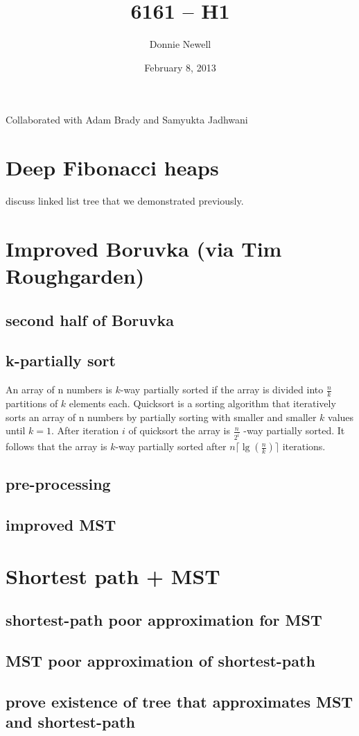 \setlength{\topmargin}{-.5in}
\setlength{\textheight}{9in}
\setlength{\oddsidemargin}{.125in}
\setlength{\textwidth}{6.25in}

\title{6161 -- H1}
\author{Donnie Newell}
\date{February 8, 2013}
\maketitle

Collaborated with Adam Brady and Samyukta Jadhwani
\section{Deep Fibonacci heaps}
discuss linked list tree that we demonstrated previously.
\section{Improved Boruvka (via Tim Roughgarden)}
\subsection{second half of Boruvka}

\subsection{k-partially sort}
An array of n numbers is $k$-way partially sorted if the array is divided into $\frac{n}{k}$ partitions of $k$ elements each. Quicksort is a sorting algorithm that iteratively sorts an array of n numbers by partially sorting with smaller and smaller $k$ values until $k = 1$. After iteration $i$ of quicksort the array is $\frac{n}{2^i}$ -way partially sorted. It follows that the array is $k$-way partially sorted after $n \lceil\lg(\frac{n}{k})\rceil$ iterations.
\subsection{pre-processing}
\subsection{improved MST}
\section{Shortest path + MST}
\subsection{shortest-path poor approximation for MST}
\subsection{MST poor approximation of shortest-path}
\subsection{prove existence of tree that approximates MST and shortest-path}
